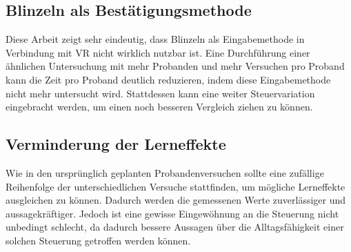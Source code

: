 \subsection{Blinzeln als Bestätigungsmethode}
Diese Arbeit zeigt sehr eindeutig, dass Blinzeln als Eingabemethode in Verbindung mit VR nicht wirklich nutzbar ist. Eine Durchführung einer ähnlichen Untersuchung mit mehr Probanden und mehr Versuchen pro Proband kann die Zeit pro Proband deutlich reduzieren, indem diese Eingabemethode nicht mehr untersucht wird. Stattdessen kann eine weiter Steuervariation eingebracht werden, um einen noch besseren Vergleich ziehen zu können. 
\subsection{Verminderung der Lerneffekte}
Wie in den ursprünglich geplanten Probandenversuchen sollte eine zufällige Reihenfolge der unterschiedlichen Versuche stattfinden, um mögliche Lerneffekte ausgleichen zu können. Dadurch werden die gemessenen Werte zuverlässiger und aussagekräftiger. Jedoch ist eine gewisse Eingewöhnung an die Steuerung nicht unbedingt schlecht, da dadurch bessere Aussagen über die Alltagsfähigkeit einer solchen Steuerung getroffen werden können. 


	
